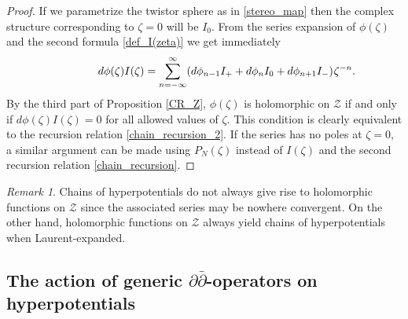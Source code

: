 \documentclass[11pt]{amsart}
\theoremstyle{remark}
\newtheorem*{remark}{Remark}
\theoremstyle{remark}
\theoremstyle{definition}
\theoremstyle{definition}
\theoremstyle{definition}
\newcommand{\Iu}{\scriptscriptstyle{I\nhp(\nhp\mathbf{u}\hspace{-0.25pt})}} %
\newcommand{\0}{{\scriptstyle 0'}} %
\newcommand{\1}{{\scriptstyle 1'}}
\newcommand{\pt}{\hspace{1pt}} %
\newcommand{\hp}{\hspace{0.5pt}} %
\newcommand{\nhp}{\hspace{-0.5pt}} %
\begin{document}
\begin{proof}

If we parametrize the twistor sphere as in \eqref{stereo_map} then the complex structure corresponding to $\zeta =0$ will be $I_0$. From the series expansion of $\phi(\zeta)$ and the second formula \eqref{def_I(zeta)} we get immediately
\begin{equation} \label{dphiQ}
\hspace{38pt}
d\phi(\zeta) I(\zeta) = \sum_{n=-\infty}^{\infty} (d\phi_{n-1}I_+ + d\phi_n I_0 + d\phi_{n+1}I_-) \hp \zeta^{-n} \rlap{.}
\end{equation} 
By the third part of Proposition \ref{CR_Z}, $\phi(\zeta)$ is holomorphic on $\mathcal{Z}$ if and only if $d\phi(\zeta) I(\zeta) = 0$ for all allowed values of $\zeta$. 
This condition is clearly equivalent to the recursion relation \eqref{chain_recursion_2}. If the series has no poles at $\zeta = 0$, a similar argument can be made using $P_N(\zeta)$ instead of $I(\zeta)$ and the second recursion relation \eqref{chain_recursion}. 
\end{proof}

\begin{remark}
Chains of hyperpotentials do not always give rise to holomorphic functions on $\mathcal{Z}$ since the associated series may be nowhere convergent. On the other hand, holomorphic functions on $\mathcal{Z}$ always yield chains of hyperpotentials when Laurent-expanded.
\end{remark}






\subsection{The action of generic $\partial\bar{\partial}$\pt-\hp operators on hyperpotentials} \hfill \medskip
\end{document}
